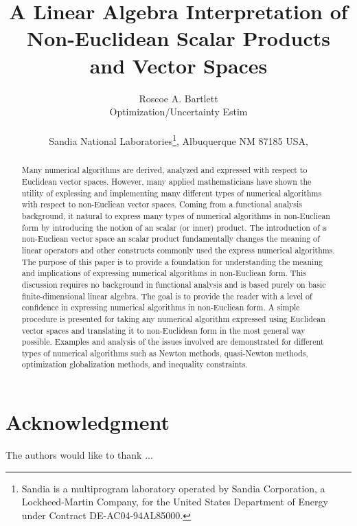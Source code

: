 \documentclass[pdf,ps2pdf,11pt]{SANDreport}
\title{\center
A Linear Algebra Interpretation of Non-Euclidean Scalar Products and Vector
Spaces}
\author{
Roscoe A. Bartlett \\ Optimization/Uncertainty Estim \\ \\ Sandia National
Laboratories\footnote{ Sandia is a multiprogram laboratory operated by Sandia
Corporation, a Lockheed-Martin Company, for the United States Department of
Energy under Contract DE-AC04-94AL85000.}, Albuquerque NM 87185 USA, \\ }
\date{}
\begin{document}
\maketitle

%

%
\begin{abstract}
%
Many numerical algorithms are derived, analyzed and expressed with respect to
Euclidean vector spaces.  However, many applied mathematicians have shown the
utility of explessing and implementing many different types of numerical
algorithms with respect to non-Eucliean vector spaces.  Coming from a
functional analysis background, it natural to express many types of numerical
algorithms in non-Eucliean form by introducing the notion of an scalar (or
inner) product.  The introduction of a non-Eucliean vector space an scalar
product fundamentally changes the meaning of linear operators and other
constructs commonly used the express numerical algorithms.  The purpose of
this paper is to provide a foundation for understanding the meaning and
implications of expressing numerical algorithms in non-Eucliean form.  This
discussion requires no background in functional analysis and is based purely
on basic finite-dimensional linear algebra.  The goal is to provide the reader
with a level of confidence in expressing numerical algorithms in non-Eucliean
form.  A simple procedure is presented for taking any numerical algorithm
expressed using Euclidean vector spaces and translating it to non-Euclidean
form in the most general way possible.  Examples and analysis of the issues
involved are demonstrated for different types of numerical algorithms such as
Newton methods, quasi-Newton methods, optimization globalization methods, and
inequality constraints.
%
\end{abstract}
%

%
\clearpage
\section*{Acknowledgment}
The authors would like to thank ...
\end{document}
